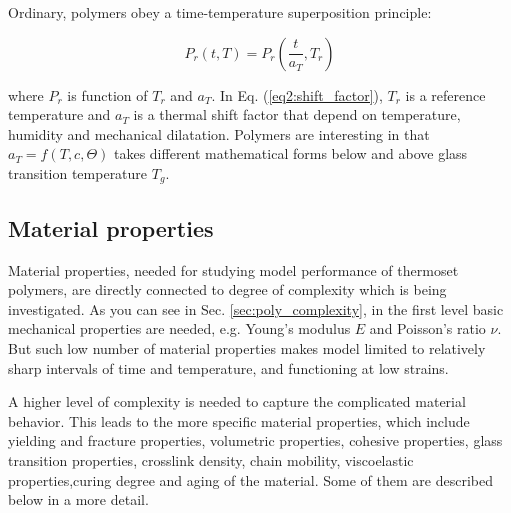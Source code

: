\begin{itemize}
	Ordinary, polymers obey a time-temperature superposition principle:
	
	\begin{equation}\label{eq2:shift_factor}
		P_{r}(t,T) = P_{r} \left(\dfrac{t}{a_{T}}, T_{r}\right)
	\end{equation}
	
	where $P_{r}$ is function of $T_{r}$ and $a_{T}$. In Eq. (\ref{eq2:shift_factor}), $T_{r}$ is a reference temperature and $a_{T}$ is a thermal shift factor that depend on temperature, humidity and mechanical dilatation. Polymers are interesting in that $a_{T} = f(T, c, \Theta)$ takes different mathematical forms below and above glass transition temperature $T_{g}$.
	
\end{itemize}


\subsection{Material properties}\label{subsec:mat_proper}
\indent

Material properties, needed for studying model performance of thermoset polymers, are directly connected to degree of complexity which is being investigated. As you can see in Sec. \ref{sec:poly_complexity}, in the first level basic mechanical properties are needed, e.g. Young's modulus $E$ and Poisson's ratio $\nu$. But such low number of material properties makes model limited to relatively sharp intervals of time and temperature, and functioning at low strains.

A higher level of complexity is needed to capture the complicated material behavior. This leads to the more specific material properties, which include yielding and fracture properties, volumetric properties, cohesive properties, glass transition properties, crosslink density, chain mobility, viscoelastic properties,curing degree and aging of the material. Some of them are described below in a more detail.	

